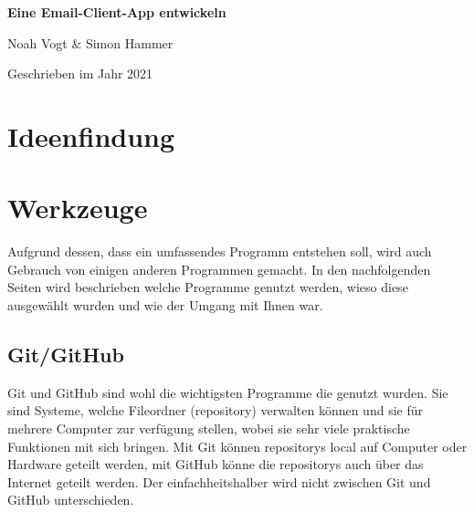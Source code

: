 \documentclass[a4paper,11pt]{article}
\begin{document}
\begin{titlepage}

\vspace*{1cm}
	\centering
	
	{\huge\bfseries Eine Email-Client-App entwickeln \par}
	\vspace{0.5cm}
	{\Large Noah Vogt \& Simon Hammer\par}
	\vspace{17cm}

	{\large Geschrieben im Jahr 2021\par}
	
\end{titlepage}

\tableofcontents
\pagebreak

\section{Ideenfindung}







\section{Werkzeuge}

Aufgrund dessen, dass ein umfassendes Programm entstehen soll, wird auch Gebrauch von einigen anderen Programmen gemacht. In den nachfolgenden Seiten wird beschrieben welche Programme genutzt
werden, wieso diese ausgewählt wurden und wie der Umgang mit Ihnen war.  





\subsection{Git/GitHub}


Git und GitHub sind wohl die wichtigsten Programme die genutzt wurden. Sie sind Systeme, welche Fileordner (repository) verwalten können und sie für mehrere Computer zur verfügung stellen, 
wobei sie sehr viele praktische Funktionen mit sich bringen. Mit Git können repositorys local auf Computer oder Hardware geteilt werden, mit GitHub könne die repositorys auch 
über das Internet geteilt werden. Der einfachheitshalber wird nicht zwischen Git und GitHub unterschieden. 
\end{document}
